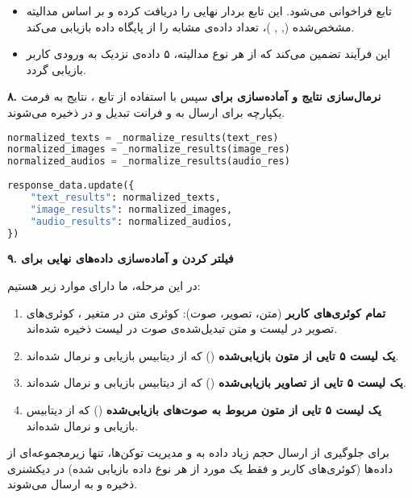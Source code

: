 \documentclass{article}
\begin{document}
\begin{itemize}
    \item تابع  فراخوانی می‌شود. این تابع بردار نهایی را دریافت کرده و بر اساس مدالیته مشخص‌شده (, , )، تعداد  داده‌ی مشابه را از پایگاه داده بازیابی می‌کند.
    \item این فرآیند تضمین می‌کند که از هر نوع مدالیته، ۵ داده‌ی نزدیک به ورودی کاربر بازیابی گردد.
\end{itemize}

\textbf{۸. نرمال‌سازی نتایج و آماده‌سازی برای }
سپس با استفاده از تابع ، نتایج به فرمت یکپارچه برای ارسال به  و فرانت تبدیل و در  ذخیره می‌شوند.

\begin{latin}
\begin{lstlisting}[language=Python]
normalized_texts = _normalize_results(text_res)
normalized_images = _normalize_results(image_res)
normalized_audios = _normalize_results(audio_res)
 
response_data.update({
    "text_results": normalized_texts,
    "image_results": normalized_images,
    "audio_results": normalized_audios,
})
\end{lstlisting}
\end{latin}

\textbf{\textbf{۹. فیلتر کردن و آماده‌سازی داده‌های نهایی برای }}

در این مرحله، ما دارای موارد زیر هستیم:
\begin{enumerate}
    \item \textbf{تمام کوئری‌های کاربر} (متن، تصویر، صوت): کوئری متن در متغیر ، کوئری‌های تصویر در لیست  و متن تبدیل‌شده‌ی صوت در لیست  ذخیره شده‌اند.
    \item \textbf{یک لیست ۵ تایی از متون بازیابی‌شده} () که از دیتابیس بازیابی و نرمال شده‌اند.
    \item \textbf{یک لیست ۵ تایی از تصاویر بازیابی‌شده} () که از دیتابیس بازیابی و نرمال شده‌اند.
    \item \textbf{یک لیست ۵ تایی از متون مربوط به صوت‌های بازیابی‌شده} () که از دیتابیس بازیابی و نرمال شده‌اند.
\end{enumerate}

برای جلوگیری از ارسال حجم زیاد داده به  و مدیریت توکن‌ها، تنها زیرمجموعه‌ای از داده‌ها (کوئری‌های کاربر و فقط یک مورد از هر نوع داده بازیابی شده) در دیکشنری  ذخیره و به  ارسال می‌شوند.
\end{document}
